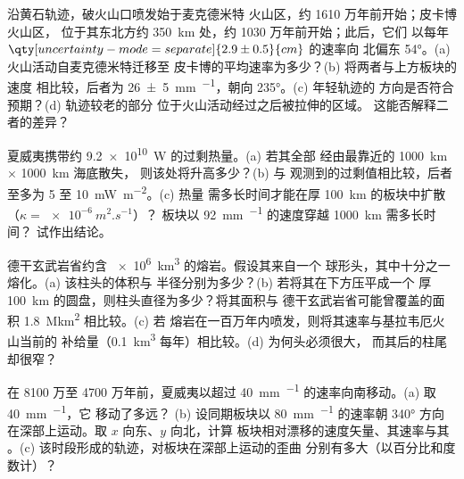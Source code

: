 \begin{exercise}[$\star\star$]\label{exo:b1:hotspots:8}
沿黄石轨迹，破火山口喷发始于麦克德米特
火山区，约 1610 万年前开始；皮卡博火山区，
位于其东北方约 \qty{350}{km} 处，约 1030 万年前开始；此后，它们
以每年 $\qty[uncertainty-mode=separate]{2.9 \pm 0.5}{cm}$ 的速率向
北偏东 \ang{54}。(a) 火山活动自麦克德米特迁移至
皮卡博的平均速率为多少？(b) 将两者与上方板块的速度
相比较，后者为 \qty[uncertainty-mode=separate]{26 \pm 5}{mm.^{-1}}，朝向 \ang{235}。(c) 年轻轨迹的
方向是否符合预期？(d) 轨迹较老的部分
位于火山活动经过之后被拉伸的区域。
这能否解释二者的差异？
\end{exercise}

\begin{exercise}[$\star\star$]\label{exo:b1:hotspots:9}
夏威夷携带约 \qty{9.2e10}{W} 的过剩热量。(a) 若其全部
经由最靠近的 \qty{1000}{km} × \qty{1000}{km} 海底散失，
则该处将升高多少？(b) 与
观测到的过剩值相比较，后者至多为 5 至 \qty{10}{mW.m^{-2}}。(c) 热量
需多长时间才能在厚 \qty{100}{km} 的板块中扩散（$\kappa = \qty{e-6}{m^2.s^{-1}}$）？
板块以 \qty{92}{mm.^{-1}} 的速度穿越 \qty{1000}{km} 需多长时间？
试作出结论。
\end{exercise}

\begin{exercise}[$\star\star\star$]\label{exo:b1:hotspots:10}
德干玄武岩省约含 \qty{e6}{km^3} 的熔岩。假设其来自一个
球形头，其中十分之一熔化。(a) 该柱头的体积与
半径分别为多少？(b) 若将其在下方压平成一个
厚 \qty{100}{km} 的圆盘，则柱头直径为多少？将其面积与
德干玄武岩省可能曾覆盖的面积 \qty{1.8}{\mega km^2} 相比较。(c) 若
熔岩在一百万年内喷发，则将其速率与基拉韦厄火山当前的
补给量（\qty{0.1}{km^3} 每年）相比较。(d) 为何头必须很大，
而其后的柱尾却很窄？
\end{exercise}

\begin{exercise}[$\star\star\star$]\label{exo:b1:hotspots:11}
在 8100 万至 4700 万年前，夏威夷以超过
\qty{40}{mm.^{-1}} 的速率向南移动。(a) 取 \qty{40}{mm.^{-1}}，它
移动了多远？
(b) 设同期板块以 \qty{80}{mm.^{-1}} 的速率朝
\ang{340} 方向在深部上运动。取 $x$ 向东、$y$ 向北，计算
板块相对漂移的速度矢量、其速率与其
。(c) 该时段形成的轨迹，对板块在深部上运动的歪曲
分别有多大（以百分比和度数计）？
\end{exercise}

